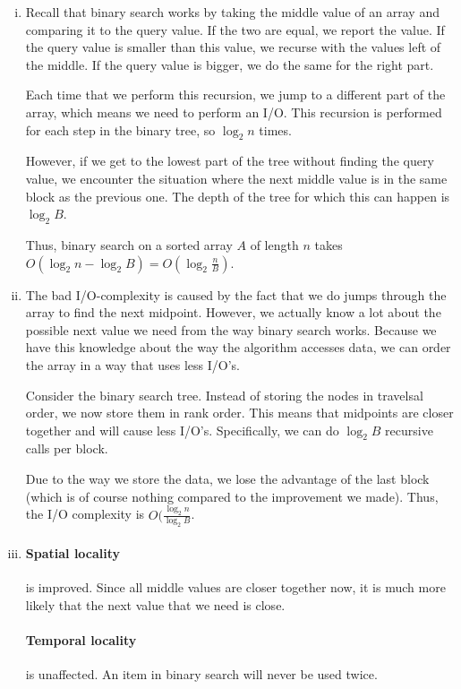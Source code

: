 \begin{enumerate}[(i)]
	\item Recall that binary search works by taking the middle value of an array and comparing it to the query value.
		If the two are equal, we report the value.
		If the query value is smaller than this value, we recurse with the values left of the middle.
		If the query value is bigger, we do the same for the right part.

		Each time that we perform this recursion, we jump to a different part of the array, which means we need to perform an I/O.
		This recursion is performed for each step in the binary tree, so $\log_2{n}$ times.

		However, if we get to the lowest part of the tree without finding the query value, we encounter the situation where the next middle value is in the same block as the previous one.
		The depth of the tree for which this can happen is $\log_2{B}$.

		Thus, binary search on a sorted array $A$ of length $n$ takes $O(\log_2{n} - \log_2{B}) = O(\log_2{\frac{n}{B}})$.
	\item The bad I/O-complexity is caused by the fact that we do jumps through the array to find the next midpoint.
		However, we actually know a lot about the possible next value we need from the way binary search works.
		Because we have this knowledge about the way the algorithm accesses data, we can order the array in a way that uses less I/O's.

		Consider the binary search tree.
		Instead of storing the nodes in travelsal order, we now store them in rank order.
		This means that midpoints are closer together and will cause less I/O's.
		Specifically, we can do $\log_2{B}$ recursive calls per block.

		Due to the way we store the data, we lose the advantage of the last block (which is of course nothing compared to the improvement we made).
		Thus, the I/O complexity is $O(\frac{\log_2{n}}{\log_2{B}}$.
	\item \paragraph{Spatial locality} is improved. Since all middle values are closer together now, it is much more likely that the next value that we need is close.
		\paragraph{Temporal locality} is unaffected. An item in binary search will never be used twice.
\end{enumerate}
